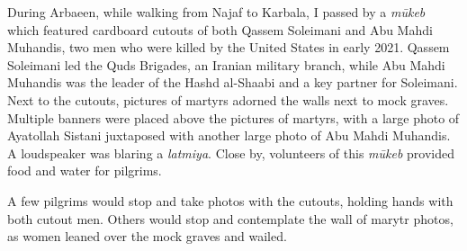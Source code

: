 



During Arbaeen, while walking from Najaf to Karbala, I passed by a \emph{mūkeb} which featured cardboard cutouts of both Qassem Soleimani and Abu Mahdi Muhandis, two men who were killed by the United States in early 2021. Qassem Soleimani led the Quds Brigades, an Iranian military branch, while Abu Mahdi Muhandis was the leader of the Hashd al-Shaabi and a key partner for Soleimani. Next to the cutouts, pictures of martyrs adorned the walls next to mock graves. Multiple banners were placed above the pictures of martyrs, with a large photo of Ayatollah Sistani juxtaposed with another large photo of Abu Mahdi Muhandis. A loudspeaker was blaring a \emph{latmiya}. Close by, volunteers of this \emph{mūkeb} provided food and water for pilgrims.

A few pilgrims would stop and take photos with the cutouts, holding hands with both cutout men. Others would stop and contemplate the wall of marytr photos, as women leaned over the mock graves and wailed.

